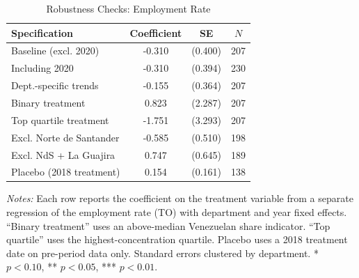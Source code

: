 \begin{table}[htbp]
\centering
\caption{Robustness Checks: Employment Rate}
\label{tab:robustness}
\begin{threeparttable}
\begin{tabular}{lccc}
\hline\hline
Specification & Coefficient & SE & $N$ \\
\hline
Baseline (excl. 2020) & -0.310 & (0.400) & 207 \\
Including 2020 & -0.310 & (0.394) & 230 \\
Dept.-specific trends & -0.155 & (0.364) & 207 \\
Binary treatment & 0.823 & (2.287) & 207 \\
Top quartile treatment & -1.751 & (3.293) & 207 \\
Excl. Norte de Santander & -0.585 & (0.510) & 198 \\
Excl. NdS + La Guajira & 0.747 & (0.645) & 189 \\
Placebo (2018 treatment) & 0.154 & (0.161) & 138 \\
\hline\hline
\end{tabular}
\begin{tablenotes}[flushleft]
\small
\item \textit{Notes:} Each row reports the coefficient on the treatment variable from a separate regression of the employment rate (TO) with department and year fixed effects. ``Binary treatment'' uses an above-median Venezuelan share indicator. ``Top quartile'' uses the highest-concentration quartile. Placebo uses a 2018 treatment date on pre-period data only. Standard errors clustered by department. * $p<0.10$, ** $p<0.05$, *** $p<0.01$.
\end{tablenotes}
\end{threeparttable}
\end{table}

